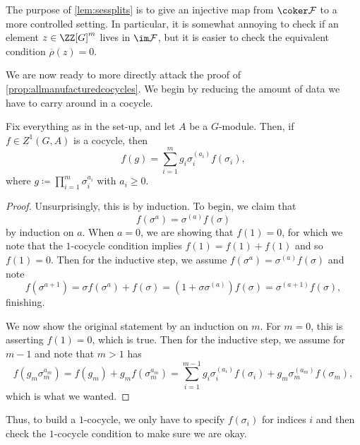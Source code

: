 \documentclass{article}
\numberwithin{equation}{section}
\begin{document}
\begin{remark}
	The purpose of \autoref{lem:sessplits} is to give an injective map from $\coker\mathcal F$ to a more controlled setting. In particular, it is somewhat annoying to check if an element $z\in\ZZ[G]^m$ lives in $\im\mathcal F$, but it is easier to check the equivalent condition $\overline\rho(z)=0$.
\end{remark}
We are now ready to more directly attack the proof of \autoref{prop:allmanufacturedcocycles}. We begin by reducing the amount of data we have to carry around in a cocycle.
\begin{lemma} \label{lem:compresscocycle}
	Fix everything as in the set-up, and let $A$ be a $G$-module. Then, if $f\in Z^1(G,A)$ is a cocycle, then
	\[f(g)=\sum_{i=1}^mg_i\sigma_i^{(a_i)}f(\sigma_i),\]
	where $g\coloneqq\prod_{i=1}^m\sigma_i^{a_i}$ with $a_i\ge0$.
\end{lemma}
\begin{proof}
	Unsurprisingly, this is by induction. To begin, we claim that
	\[f\left(\sigma^a\right)=\sigma^{(a)}f(\sigma)\]
	by induction on $a$. When $a=0$, we are showing that $f(1)=0$, for which we note that the $1$-cocycle condition implies $f(1)=f(1)+f(1)$ and so $f(1)=0$. Then for the inductive step, we assume $f(\sigma^a)=\sigma^{(a)}f(\sigma)$ and note
	\[f\left(\sigma^{a+1}\right)=\sigma f\left(\sigma^a\right)+f(\sigma)=\left(1+\sigma\sigma^{(a)}\right)f(\sigma)=\sigma^{(a+1)}f(\sigma),\]
	finishing.

	We now show the original statement by an induction on $m$. For $m=0$, this is asserting $f(1)=0$, which is true. Then for the inductive step, we assume for $m-1$ and note that $m>1$ has
	\[f\left(g_m\sigma_m^{a_m}\right)=f(g_m)+g_mf\left(\sigma_m^{a_m}\right)=\sum_{i=1}^{m-1}g_i\sigma_i^{(a_i)}f(\sigma_i)+g_m\sigma_m^{(a_m)}f(\sigma_m),\]
	which is what we wanted.
\end{proof}
Thus, to build a $1$-cocycle, we only have to specify $f(\sigma_i)$ for indices $i$ and then check the $1$-cocycle condition to make sure we are okay.
\end{document}
